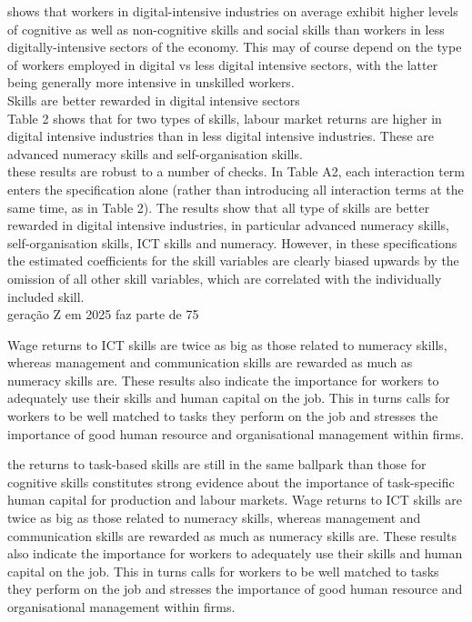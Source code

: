 shows that workers in digital-intensive industries on average exhibit higher levels of cognitive as well as non-cognitive skills and social skills than workers in less digitally-intensive sectors of the economy. This may of course depend on the type of workers employed in digital vs less digital intensive sectors, with the latter being generally more intensive in unskilled workers.\\

Skills are better rewarded in digital intensive sectors\\

Table 2 shows that for two types of skills, labour market returns are higher in digital intensive industries than in less digital intensive industries. These are advanced numeracy skills and self-organisation skills.\\

these results are robust to a number of checks. In Table A2, each interaction term enters the specification alone (rather than introducing all interaction terms at the same time, as in Table 2). The results show that all type of skills are better rewarded in digital intensive industries, in particular advanced numeracy skills, self-organisation skills, ICT skills and numeracy. However, in these specifications the estimated coefficients for the skill variables are clearly biased upwards by the omission of all other skill variables, which are correlated with the individually included skill.\\

geração Z em 2025 faz parte de 75%

Wage returns to ICT skills are twice as big as those related to numeracy skills, whereas management and communication skills are rewarded as much as numeracy skills are. These results also indicate the importance for workers to adequately use their skills and human capital on the job. This in turns calls for workers to be well matched to tasks they perform on the job and stresses the importance of good human resource and organisational management within firms.

the returns to task-based skills are still in the same ballpark than those for cognitive skills constitutes strong evidence about the importance of task-specific human capital for production and labour markets. Wage returns to ICT skills are twice as big as those related to numeracy skills, whereas management and communication skills are rewarded as much as numeracy skills are. These results also indicate the importance for workers to adequately use their skills and human capital on the job. This in turns calls for workers to be well matched to tasks they perform on the job and stresses the importance of good human resource and organisational management within firms.\\

